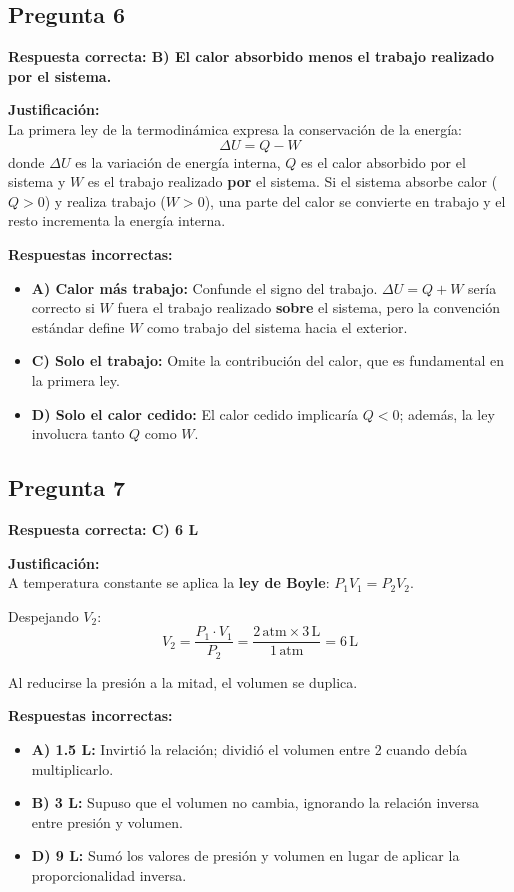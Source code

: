 \begin{respuestabox}
\subsection*{Pregunta 6}
\textcolor{verdecorrecto}{\textbf{Respuesta correcta: B) El calor absorbido menos el trabajo realizado por el sistema.}}

\textbf{Justificación:}\\
La primera ley de la termodinámica expresa la conservación de la energía:
$$\Delta U = Q - W$$
donde $\Delta U$ es la variación de energía interna, $Q$ es el calor absorbido por el sistema y $W$ es el trabajo realizado \textbf{por} el sistema. Si el sistema absorbe calor ($Q > 0$) y realiza trabajo ($W > 0$), una parte del calor se convierte en trabajo y el resto incrementa la energía interna.

\textbf{Respuestas incorrectas:}
\begin{itemize}
    \item \textbf{A) Calor más trabajo:} Confunde el signo del trabajo. $\Delta U = Q + W$ sería correcto si $W$ fuera el trabajo realizado \textbf{sobre} el sistema, pero la convención estándar define $W$ como trabajo del sistema hacia el exterior.
    \item \textbf{C) Solo el trabajo:} Omite la contribución del calor, que es fundamental en la primera ley.
    \item \textbf{D) Solo el calor cedido:} El calor cedido implicaría $Q < 0$; además, la ley involucra tanto $Q$ como $W$.
\end{itemize}
\end{respuestabox}

\begin{respuestabox}
\subsection*{Pregunta 7}
\textcolor{verdecorrecto}{\textbf{Respuesta correcta: C) 6 L}}

\textbf{Justificación:}\\
A temperatura constante se aplica la \textbf{ley de Boyle}: $P_1 V_1 = P_2 V_2$.

Despejando $V_2$:
$$V_2 = \frac{P_1 \cdot V_1}{P_2} = \frac{2\,\text{atm} \times 3\,\text{L}}{1\,\text{atm}} = 6\,\text{L}$$

Al reducirse la presión a la mitad, el volumen se duplica.

\textbf{Respuestas incorrectas:}
\begin{itemize}
    \item \textbf{A) 1.5 L:} Invirtió la relación; dividió el volumen entre 2 cuando debía multiplicarlo.
    \item \textbf{B) 3 L:} Supuso que el volumen no cambia, ignorando la relación inversa entre presión y volumen.
    \item \textbf{D) 9 L:} Sumó los valores de presión y volumen en lugar de aplicar la proporcionalidad inversa.
\end{itemize}
\end{respuestabox}

